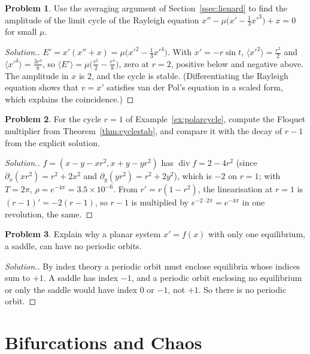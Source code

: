 \documentclass[11pt,a4paper]{article}
\numberwithin{equation}{section}
\theoremstyle{definition}
\newtheorem{problemx}{Problem}[subsection]
\newenvironment{problem}{\begin{problemx}}{\end{problemx}}
\newenvironment{solution}
  {\renewcommand{\qedsymbol}{}\begin{proof}[\textit{Solution}.]}
  {\end{proof}}
\begin{document}
\begin{problem}
Use the averaging argument of Section~\ref{ssec:lienard} to find the amplitude of the limit cycle of the Rayleigh equation $x'' - \mu\bigl(x' - \frac13x'^3\bigr) + x = 0$ for small $\mu$.
\end{problem}

\begin{solution}
$E' = x'(x'' + x) = \mu\bigl(x'^2 - \frac13x'^4\bigr)$. With $x' = -r\sin t$, $\langle x'^2\rangle = \frac{r^2}{2}$ and $\langle x'^4\rangle = \frac{3r^4}{8}$, so $\langle E'\rangle = \mu\bigl(\frac{r^2}{2} - \frac{r^4}{8}\bigr)$, zero at $r = 2$, positive below and negative above. The amplitude in
$x$ is $2$, and the cycle is stable. (Differentiating the Rayleigh equation shows that $v = x'$ satisfies van der Pol's equation in a scaled form, which explains the coincidence.)
\end{solution}

\begin{problem}
For the cycle $r = 1$ of Example~\ref{ex:polarcycle}, compute the Floquet multiplier from Theorem~\ref{thm:cyclestab}, and compare it with the decay of $r - 1$ from the explicit solution.
\end{problem}

\begin{solution}
$f = (x - y - xr^2, x + y - yr^2)$ has $\operatorname{div}f = 2 - 4r^2$ (since $\partial_x(xr^2) = r^2 + 2x^2$ and $\partial_y(yr^2) = r^2 + 2y^2$), which is $-2$ on $r = 1$; with $T = 2\pi$, $\rho = e^{-4\pi} = 3.5 \times 10^{-6}$. From $r' = r(1 - r^2)$, the
linearisation at $r = 1$ is $(r - 1)' = -2(r - 1)$, so $r - 1$ is multiplied by $e^{-2 \cdot 2\pi} = e^{-4\pi}$ in one revolution, the same.
\end{solution}

\begin{problem}
Explain why a planar system $x' = f(x)$ with only one equilibrium, a saddle, can have no periodic orbits.
\end{problem}

\begin{solution}
By index theory a periodic orbit must enclose equilibria whose indices sum to $+1$. A saddle has index $-1$, and a periodic orbit enclosing no equilibrium or only the saddle would have index $0$ or
$-1$, not $+1$. So there is no periodic orbit.
\end{solution}

\section{Bifurcations and Chaos}
\label{sec:bifurcation}
\end{document}
